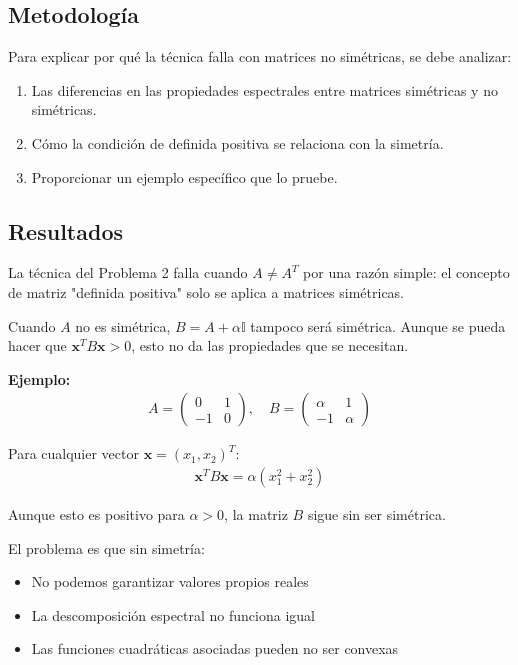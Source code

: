 \documentclass{article}
\begin{document}
\subsection{Metodología}

Para explicar por qué la técnica falla con matrices no simétricas, se debe analizar:
\begin{enumerate}
    \item Las diferencias en las propiedades espectrales entre matrices simétricas y no simétricas.
    \item Cómo la condición de definida positiva se relaciona con la simetría.
    \item Proporcionar un ejemplo específico que lo pruebe.
\end{enumerate}

\subsection{Resultados}
\setcounter{equation}{0}

La técnica del Problema 2 falla cuando $A \neq A^T$ por una razón simple: el concepto de matriz "definida positiva" solo se aplica a matrices simétricas.

Cuando $A$ no es simétrica, $B = A + \alpha \mathbb{I}$ tampoco será simétrica. Aunque se pueda hacer que $\mathbf{x}^T B \mathbf{x} > 0$, esto no da las propiedades que se necesitan.

\textbf{Ejemplo:}
\begin{align}
A = \begin{pmatrix}
0 & 1 \\
-1 & 0
\end{pmatrix}, \quad B = \begin{pmatrix}
\alpha & 1 \\
-1 & \alpha
\end{pmatrix}
\end{align}

Para cualquier vector $\mathbf{x} = (x_1, x_2)^T$:
\begin{align}
\mathbf{x}^T B \mathbf{x} = \alpha(x_1^2 + x_2^2)
\end{align}

Aunque esto es positivo para $\alpha > 0$, la matriz $B$ sigue sin ser simétrica. 

El problema es que sin simetría:
\begin{itemize}
    \item No podemos garantizar valores propios reales
    \item La descomposición espectral no funciona igual
    \item Las funciones cuadráticas asociadas pueden no ser convexas
\end{itemize}
\end{document}
